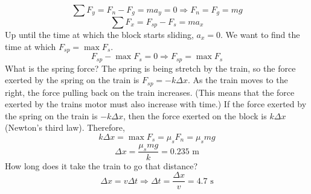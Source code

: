$$\sum F_y = F_n-F_g=ma_y=0 \Rightarrow F_n=F_g=mg$$
$$\sum F_x = F_{sp}-F_s=ma_x$$
Up until the time at which the block starts sliding, $a_x=0$. We want to find the time at which $F_{sp}=\max F_s$.
$$F_{sp}-\max F_s=0\Rightarrow F_{sp}=\max F_s$$
What is the spring force? The spring is being stretch by the train, so the force exerted by the spring on the train is $F_{sp}=-k\Delta{x}$. As the train moves to the right, the force pulling back on the train increases. (This means that the force exerted by the trains motor must also increase with time.) If the force exerted by the spring on the train is $-k\Delta{x}$, then the force exerted on the block is $k\Delta{x}$ (Newton's third law). Therefore,
$$k\Delta{x}=\max F_s=\mu_s F_n=\mu_s mg$$
$$\Delta{x}=\frac{\mu_s mg}{k}=0.235\mbox{ m}$$
How long does it take the train to go that distance?
$$\Delta{x}=v\Delta{t}\Rightarrow \Delta{t}=\frac{\Delta{x}}{v}=4.7\mbox{ s}$$


\clearpage
